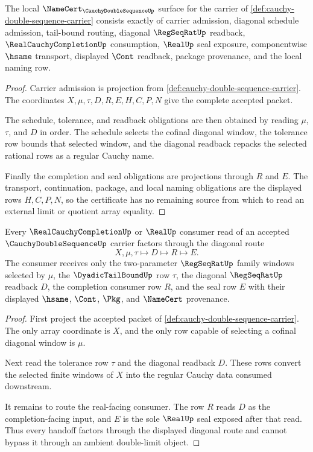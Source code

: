 \begin{theorem}\label{thm:cauchy-double-sequence-namecert-obligations}
The local $\NameCert_{\CauchyDoubleSequenceUp}$ surface for the carrier of \autoref{def:cauchy-double-sequence-carrier} consists exactly of carrier admission, diagonal schedule admission, tail-bound routing, diagonal $\RegSeqRatUp$ readback, $\RealCauchyCompletionUp$ consumption, $\RealUp$ seal exposure, componentwise $\hsame$ transport, displayed $\Cont$ readback, package provenance, and the local naming row.
\end{theorem}
\begin{proof}
Carrier admission is projection from \autoref{def:cauchy-double-sequence-carrier}. The coordinates $X,\mu,\tau,D,R,E,H,C,P,N$ give the complete accepted packet.

The schedule, tolerance, and readback obligations are then obtained by reading $\mu$, $\tau$, and $D$ in order. The schedule selects the cofinal diagonal window, the tolerance row bounds that selected window, and the diagonal readback repacks the selected rational rows as a regular Cauchy name.

Finally the completion and seal obligations are projections through $R$ and $E$. The transport, continuation, package, and local naming obligations are the displayed rows $H,C,P,N$, so the certificate has no remaining source from which to read an external limit or quotient array equality.
\end{proof}

\begin{theorem}\label{thm:cauchy-double-sequence-diagonal-handoff}
Every $\RealCauchyCompletionUp$ or $\RealUp$ consumer read of an accepted $\CauchyDoubleSequenceUp$ carrier factors through the diagonal route
$$
X,\mu,\tau \longmapsto D \longmapsto R \longmapsto E.
$$
The consumer receives only the two-parameter $\RegSeqRatUp$ family windows selected by $\mu$, the $\DyadicTailBoundUp$ row $\tau$, the diagonal $\RegSeqRatUp$ readback $D$, the completion consumer row $R$, and the seal row $E$ with their displayed $\hsame$, $\Cont$, $\Pkg$, and $\NameCert$ provenance.
\end{theorem}
\begin{proof}
First project the accepted packet of \autoref{def:cauchy-double-sequence-carrier}. The only array coordinate is $X$, and the only row capable of selecting a cofinal diagonal window is $\mu$.

Next read the tolerance row $\tau$ and the diagonal readback $D$. These rows convert the selected finite windows of $X$ into the regular Cauchy data consumed downstream.

It remains to route the real-facing consumer. The row $R$ reads $D$ as the completion-facing input, and $E$ is the sole $\RealUp$ seal exposed after that read. Thus every handoff factors through the displayed diagonal route and cannot bypass it through an ambient double-limit object.
\end{proof}

